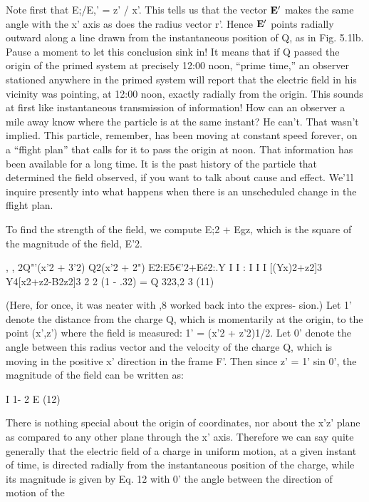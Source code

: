 Note first that E;/E,' = z' / x'. This tells us that the vector $\mathbf{E}'$ makes
the same angle with the x' axis as does the radius vector r'. Hence
$\mathbf{E}'$ points radially outward along a line drawn from the instantaneous
position of Q, as in Fig. 5.1lb. Pause a moment to let this conclusion
sink in! It means that if Q passed the origin of the primed system at
precisely 12:00 noon, ``prime time,'' an observer stationed anywhere
in the primed system will report that the electric field in his vicinity
was pointing, at 12:00 noon, exactly radially from the origin. This
sounds at first like instantaneous transmission of information! How
can an observer a mile away know where the particle is at the same
instant? He can't. That wasn't implied. This particle, remember,
has been moving at constant speed forever, on a ``ffight plan'' that
calls for it to pass the origin at noon. That information has been
available for a long time. It is the past history of the particle that
determined the field observed, if you want to talk about cause and
effect. We'1l inquire presently into what happens when there is an
unscheduled change in the ffight plan.

To find the strength of the field, we compute E;2 + Egz, which is
the square of the magnitude of the field, E'2.

\begin{equation}
\end{equation}
, , 2Q"'(x'2 + 3'2) Q2(x'2 + 2")
E2:E5€'2+Eé2:.Y I I : I I I
[(Yx)2+z2]3 Y4[x2+z2-B2z2]3
2 2
(1 - .32)
= Q 323,2 3 (11)

(Here, for once, it was neater with ,8 worked back into the expres-
sion.) Let 1' denote the distance from the charge Q, which is
momentarily at the origin, to the point (x',z') where the field is
measured: 1' = (x'2 + z'2)1/2. Let 0' denote the angle between this
radius vector and the velocity of the charge Q, which is moving in
the positive x' direction in the frame F'. Then since z' = 1' sin 0', the
magnitude of the field can be written as:

\begin{equation}
\end{equation}
I 1- 2
E  (12)

There is nothing special about the origin of coordinates, nor about
the x'z' plane as compared to any other plane through the x' axis.
Therefore we can say quite generally that the electric field of a charge
in uniform motion, at a given instant of time, is directed radially from
the instantaneous position of the charge, while its magnitude is given
by Eq. 12 with 0' the angle between the direction of motion of the

